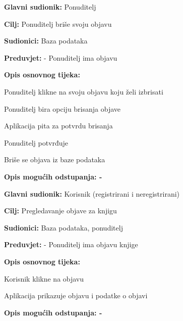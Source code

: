                     \noindent {}
					\begin{packed_item}
	
						\item \textbf{Glavni sudionik: } Ponuditelj
						\item  \textbf{Cilj:} Ponuditelj briše svoju objavu
						\item  \textbf{Sudionici:} Baza podataka
						\item  \textbf{Preduvjet:} - Ponuditelj ima objavu
						\item  \textbf{Opis osnovnog tijeka:}
						
						\item[] \begin{packed_enum}
	
							\item Ponuditelj klikne na svoju objavu koju želi izbrisati
                            					\item Ponuditelj bira opciju brisanja objave
							\item Aplikacija pita za potvrdu brisanja
                            					\item Ponuditelj potvrđuje
                            					\item Briše se objava iz baze podataka
						\end{packed_enum}
						
						\item  \textbf{Opis mogućih odstupanja: -}
					\end{packed_item}

                    \noindent {}
					\begin{packed_item}
	
						\item \textbf{Glavni sudionik: } Korisnik (registrirani i neregistrirani)
						\item  \textbf{Cilj:} Pregledavanje objave za knjigu
						\item  \textbf{Sudionici:} Baza podataka, ponuditelj
						\item  \textbf{Preduvjet:} - Ponuditelj ima objavu knjige
						\item  \textbf{Opis osnovnog tijeka:}
						
						\item[] \begin{packed_enum}	
							\item Korisnik klikne na objavu
                            					\item Aplikacija prikazuje objavu i podatke o objavi
						\end{packed_enum}
						
						\item  \textbf{Opis mogućih odstupanja: -}
					\end{packed_item}


